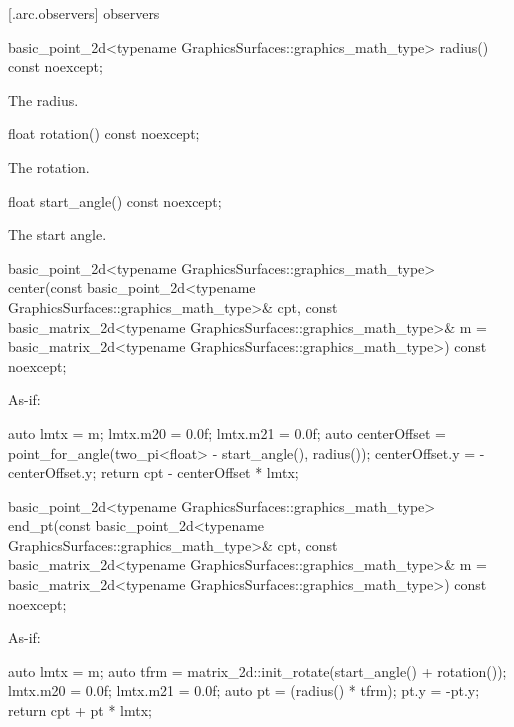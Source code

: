  [\iotwod.arc.observers]{ observers}

%
\begin{itemdecl}
basic_point_2d<typename GraphicsSurfaces::graphics_math_type> radius() const noexcept;
\end{itemdecl}
\begin{itemdescr}
\pnum
\returns
The radius.
\end{itemdescr}

%
\begin{itemdecl}
float rotation() const noexcept;
\end{itemdecl}
\begin{itemdescr}
\pnum
\returns
The rotation.
\end{itemdescr}

%
\begin{itemdecl}
float start_angle() const noexcept;
\end{itemdecl}
\begin{itemdescr}
\pnum
\returns
The start angle.
\end{itemdescr}

%
\begin{itemdecl}
basic_point_2d<typename GraphicsSurfaces::graphics_math_type> center(const basic_point_2d<typename
  GraphicsSurfaces::graphics_math_type>& cpt, const basic_matrix_2d<typename
  GraphicsSurfaces::graphics_math_type>& m = basic_matrix_2d<typename
  GraphicsSurfaces::graphics_math_type>{}) const noexcept;
\end{itemdecl}
\begin{itemdescr}
\pnum
\returns
As-if:
\begin{codeblock}
auto lmtx = m;
lmtx.m20 = 0.0f;
lmtx.m21 = 0.0f;
auto centerOffset = point_for_angle(two_pi<float> - start_angle(), radius());
centerOffset.y = -centerOffset.y;
return cpt - centerOffset * lmtx;
\end{codeblock}
\end{itemdescr}

%
\begin{itemdecl}
basic_point_2d<typename GraphicsSurfaces::graphics_math_type> end_pt(const basic_point_2d<typename
  GraphicsSurfaces::graphics_math_type>& cpt, const basic_matrix_2d<typename
  GraphicsSurfaces::graphics_math_type>& m = basic_matrix_2d<typename
  GraphicsSurfaces::graphics_math_type>{}) const noexcept;
\end{itemdecl}
\begin{itemdescr}
\pnum
\returns
As-if:
\begin{codeblock}
auto lmtx = m;
auto tfrm = matrix_2d::init_rotate(start_angle() + rotation());
lmtx.m20 = 0.0f;
lmtx.m21 = 0.0f;
auto pt = (radius() * tfrm);
pt.y = -pt.y;
return cpt + pt * lmtx;
\end{codeblock}
\end{itemdescr}

